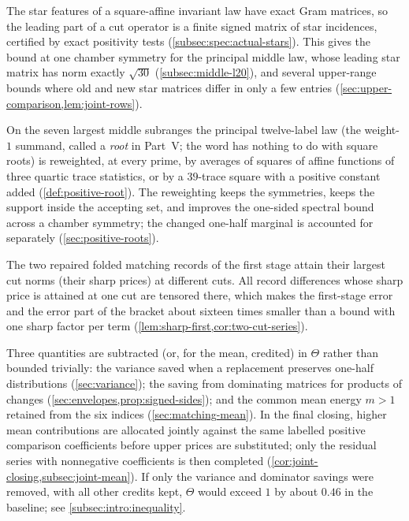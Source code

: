 \begin{description}[leftmargin=2.2em,style=nextline]
\item[Star-shaped features with exactly computable Gram matrices]
The star features of a square-affine invariant law have exact Gram
matrices, so the leading part of a cut operator is a finite signed matrix
of star incidences, certified by exact positivity tests
(\cref{subsec:spec:actual-stars}). This gives the bound at one
chamber symmetry for the principal middle law, whose leading star
matrix has norm exactly $\sqrt{30}$ (\cref{subsec:middle-l20}), and
several upper-range bounds where old and new star matrices differ
in only a few entries (\cref{sec:upper-comparison,lem:joint-rows}).

\item[Reweighting the principal twelve-label law by a nonnegative function]
On the seven largest middle subranges the principal twelve-label law
(the weight-$1$ summand, called a \emph{root} in Part~V; the word has
nothing to do with square roots) is reweighted, at every prime, by
averages of squares of affine functions of three quartic trace
statistics, or by a $39$-trace square with a positive constant added
(\cref{def:positive-root}). The reweighting keeps the symmetries,
keeps the support inside the accepting set, and improves the
one-sided spectral bound across a chamber symmetry; the changed
one-half marginal is accounted for separately
(\cref{sec:positive-roots}).

\item[Errors are tensored at the cut where they are largest]
The two repaired folded matching records of the first stage attain
their largest cut norms (their sharp prices) at different cuts.
All record differences whose sharp price is attained at one cut
are tensored there, which makes the first-stage error and the
error part of the bracket about sixteen times smaller than a bound
with one sharp factor per term
(\cref{lem:sharp-first,cor:two-cut-series}).

\item[Subtractions in the closing inequality (variance, dominators, mean)]
Three quantities are subtracted (or, for the mean, credited) in
$\Theta$ rather than bounded trivially: the variance saved when a
replacement preserves one-half distributions
(\cref{sec:variance}); the saving from dominating matrices for
products of changes (\cref{sec:envelopes,prop:signed-sides}); and
the common mean energy $m>1$ retained from the six indices
(\cref{sec:matching-mean}). In the final closing, higher mean
contributions are allocated jointly against the same labelled positive
comparison coefficients before upper prices are substituted; only the
residual series with nonnegative coefficients is then completed
(\cref{cor:joint-closing,subsec:joint-mean}). If only the variance and dominator
savings were removed, with all other credits kept, $\Theta$ would
exceed $1$ by about $0.46$ in the baseline; see
\cref{subsec:intro:inequality}.


\end{description}
